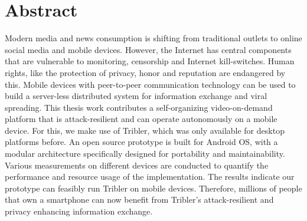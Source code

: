 \chapter*{Abstract}

Modern media and news consumption is shifting from traditional outlets to online social media and mobile devices.
However, the Internet has central components that are vulnerable to monitoring, censorship and Internet kill-switches.
Human rights, like the protection of privacy, honor and reputation are endangered by this.
Mobile devices with peer-to-peer communication technology can be used to build a server-less distributed system for information exchange and viral spreading.
This thesis work contributes a self-organizing video-on-demand platform that is attack-resilient and can operate autonomously on a mobile device.
For this, we make use of Tribler, which was only available for desktop platforms before.
An open source prototype is built for Android OS, with a modular architecture specifically designed for portability and maintainability.
Various measurements on different devices are conducted to quantify the performance and resource usage of the implementation.
The results indicate our prototype can feasibly run Tribler on mobile devices.
Therefore, millions of people that own a smartphone can now benefit from Tribler’s attack-resilient and privacy enhancing information exchange.

